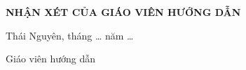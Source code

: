 \begin{center}
\large {\textbf{NHẬN XÉT CỦA GIÁO VIÊN HƯỚNG DẪN}}
\end{center}

\noindent\makebox[\textwidth]{\dotfill}

\vspace{0.35cm}
\noindent\makebox[\textwidth]{\dotfill}

\vspace{0.35cm}
\noindent\makebox[\textwidth]{\dotfill}

\vspace{0.35cm}
\noindent\makebox[\textwidth]{\dotfill}

\vspace{0.35cm}
\noindent\makebox[\textwidth]{\dotfill}

\vspace{0.35cm}
\noindent\makebox[\textwidth]{\dotfill}

\vspace{0.35cm}
\noindent\makebox[\textwidth]{\dotfill}

\vspace{0.35cm}
\noindent\makebox[\textwidth]{\dotfill}

\vspace{0.35cm}
\noindent\makebox[\textwidth]{\dotfill}

\vspace{0.35cm}
\noindent\makebox[\textwidth]{\dotfill}

\vspace{0.35cm}
\noindent\makebox[\textwidth]{\dotfill}

\vspace{0.35cm}
\noindent\makebox[\textwidth]{\dotfill}

\vspace{1.2cm}

\begin{flushright}
Thái Nguyên, tháng \ldots{} năm \ldots

Giáo viên hướng dẫn

\vspace{3cm}
\end{flushright}
